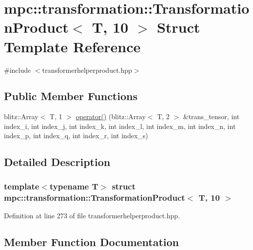 \hypertarget{structmpc_1_1transformation_1_1_transformation_product_3_01_t_00_0110_01_4}{}\section{mpc\+:\+:transformation\+:\+:Transformation\+Product$<$ T, 10 $>$ Struct Template Reference}
\label{structmpc_1_1transformation_1_1_transformation_product_3_01_t_00_0110_01_4}


{\ttfamily \#include $<$transformerhelperproduct.\+hpp$>$}

\subsection*{Public Member Functions}
\begin{DoxyCompactItemize}
\item 
blitz\+::\+Array$<$ T, 1 $>$ \mbox{\hyperlink{structmpc_1_1transformation_1_1_transformation_product_3_01_t_00_0110_01_4_a72b694e154212f9c81c067bde6030399}{operator()}} (blitz\+::\+Array$<$ T, 2 $>$ \&trans\+\_\+tensor, int index\+\_\+i, int index\+\_\+j, int index\+\_\+k, int index\+\_\+l, int index\+\_\+m, int index\+\_\+n, int index\+\_\+p, int index\+\_\+q, int index\+\_\+r, int index\+\_\+s)
\end{DoxyCompactItemize}


\subsection{Detailed Description}
\subsubsection*{template$<$typename T$>$\newline
struct mpc\+::transformation\+::\+Transformation\+Product$<$ T, 10 $>$}



Definition at line 273 of file transformerhelperproduct.\+hpp.



\subsection{Member Function Documentation}
\mbox{\label{structmpc_1_1transformation_1_1_transformation_product_3_01_t_00_0110_01_4_a72b694e154212f9c81c067bde6030399}} 
